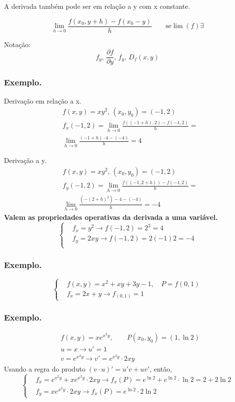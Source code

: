 A derivada também pode ser em relação a y com x constante.

\[ \lim_{h\to0}\frac{f(x_0, y+h)-f(x_0-y)}{h}\qquad \text{se}
\lim(f)\exists\]

Notação:
\[ f_y,\,\frac{\partial f}{\partial y},\,f_y,\,D_f(x,y) \]

\subsubsection{\textbf{Exemplo.}}%

Derivação em relação a x.
\begin{align*}
  &f(x,y)=xy^2,\,(x_0,y_0)=(-1,2)\\
  &f_x(-1,2)= \lim_{h\to0}\frac{f((-1+h),2)-f(-1,2)}{h}=\\
  &\lim_{h\to 0}\frac{(-1+h)\cdot 4-(-4)}{h}=4 
\end{align*}

Derivação a y.
\begin{align*}
  &f(x,y)=xy^2,\,(x_0,y_0)=(-1,2)\\
  &f_y(-1,2)= \lim_{h\to0}\frac{f((-1,2+h))-f(-1,2)}{h}=\\
  &\lim_{h\to 0}\frac{(-(2+h)^2)- 4-(-4)}{h}=-4 
\end{align*}
\textbf{Valem as propriedades operativas da derivada a uma variável.}
\[\begin{cases}
  &f_x=y^2\to f(-1,2)=2^2=4\\
  &f_y=2xy\to f(-1,2)=2(-1)2=-4 \\
\end{cases}\]
\subsubsection{\textbf{Exemplo.}}
\[\begin{cases}
  &f(x,y)=x^2+xy+3y-1,\quad P=f(0,1)\\
  &f_x=2x+y\to f_(0,1)=1
\end{cases}\]
\subsubsection{\textbf{Exemplo.}}
\begin{align*}
  &f(x,y)=xe^{x^2y},\qquad P(x_0,y_0)=(1,\ln2)\\
  &u=x\to u'=1\\
  &v=e^{x^2y}\to v'=e^{x^2y}\cdot2xy
\end{align*}
Usando a regra do produto $(v\cdot u)'=u'v+uv'$, então,
\[\begin{cases}
  &f_x= e^{x^2y}+xe^{x^2y}\cdot2xy\to f_x(P)=e^{\ln2}+e^{\ln2}\cdot\ln2=2+2\ln2\\
  &f_y= xe^{x^2y}\cdot2xy\to f_x(P)=e^{\ln2}\cdot2\ln2
\end{cases}\]
